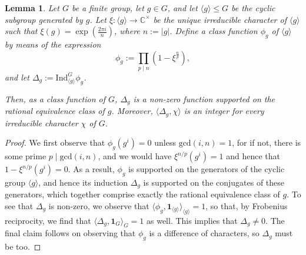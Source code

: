 \documentclass[12pt]{amsart}
\newtheorem{lemma}[theorem]{Lemma}
\theoremstyle{definition} \newtheorem{definition}[theorem]{Definition}
\theoremstyle{example} \newtheorem{example}[theorem]{Example}
\theoremstyle{remark} \newtheorem{remark}{Remark}[theorem]
\numberwithin{equation}{section}
\numberwithin{theorem}{section}
\renewcommand{\leq}{\leqslant}
\begin{document}
	\begin{lemma} \label{lem:class-function-construction}
		Let $G$ be a finite group, let $g \in G$, and let $\langle g \rangle \leq G$ be the cyclic subgroup generated by $g$.  Let $\xi \colon \langle g \rangle \to \mathbb{C}^\times$ be the unique irreducible character of $\langle g \rangle$ such that $\xi(g) = \exp\left(\frac{2\pi i}{n}\right)$, where $n := |g|$.  Define a class function $\phi_g$ of $\langle g\rangle$ by means of the expression
			\begin{equation} \label{eqn:phi-def}
				\phi_g := \prod_{p \mid n} \left(1 - \xi^{\frac{n}{p}}\right),
			\end{equation}
		and let $\Delta_g := \mathrm{Ind}_{\langle g\rangle}^G \phi_g$.
		
		Then, as a class function of $G$, $\Delta_g$ is a non-zero function supported on the rational equivalence class of $g$.  Moreover, $\langle \Delta_g, \chi \rangle$ is an integer for every irreducible character $\chi$ of $G$.
	\end{lemma}
	\begin{proof}
		We first observe that $\phi_g(g^i) = 0$ unless $\mathrm{gcd}(i,n) = 1$, for if not, there is some prime $p \mid \mathrm{gcd}(i,n)$, and we would have $\xi^{n/p}(g^i) = 1$ and hence that $1-\xi^{n/p}(g^i)=0$.  As a result, $\phi_g$ is supported on the generators of the cyclic group $\langle g \rangle$, and hence its induction $\Delta_g$ is supported on the conjugates of these generators, which together comprise exactly the rational equivalence class of $g$.  To see that $\Delta_g$ is non-zero, we observe that $\langle \phi_g, \mathbf{1}_{\langle g\rangle} \rangle_{\langle g\rangle} = 1$, so that, by Frobenius reciprocity, we find that $\langle \Delta_g, \mathbf{1}_G\rangle_G = 1$ as well.  This implies that $\Delta_g \ne 0$.  The final claim follows on observing that $\phi_g$ is a difference of characters, so $\Delta_g$ must be too.
	\end{proof}
	
\end{document}
